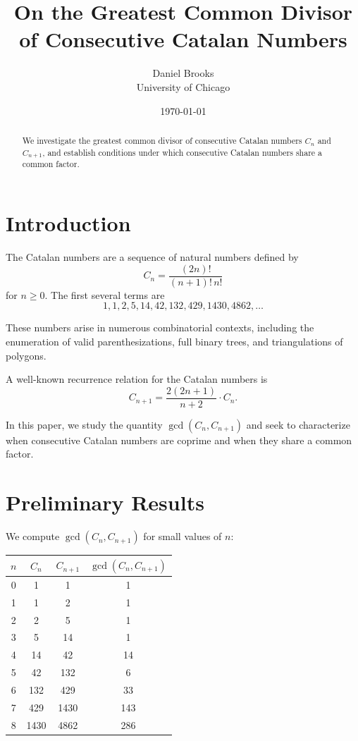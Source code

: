 \documentclass[12pt]{article}
\title{On the Greatest Common Divisor of Consecutive Catalan Numbers}
\author{Daniel Brooks \\ \small University of Chicago}
\date{\today}
\theoremstyle{definition}
\theoremstyle{remark}
\begin{document}
\maketitle

\begin{abstract}
We investigate the greatest common divisor of consecutive Catalan numbers $C_n$ and $C_{n+1}$, and establish conditions under which consecutive Catalan numbers share a common factor.
\end{abstract}

\section{Introduction}

The Catalan numbers are a sequence of natural numbers defined by
\[
C_n = \frac{(2n)!}{(n+1)!\, n!}
\]
for $n \geq 0$. The first several terms are
\[
1, 1, 2, 5, 14, 42, 132, 429, 1430, 4862, \ldots
\]

These numbers arise in numerous combinatorial contexts, including the enumeration of valid parenthesizations, full binary trees, and triangulations of polygons.

A well-known recurrence relation for the Catalan numbers is
\begin{equation}\label{eq:recurrence}
C_{n+1} = \frac{2(2n+1)}{n+2} \cdot C_n.
\end{equation}

In this paper, we study the quantity $\gcd(C_n, C_{n+1})$ and seek to characterize when consecutive Catalan numbers are coprime and when they share a common factor.

\newpage
\section{Preliminary Results}

We compute $\gcd(C_n, C_{n+1})$ for small values of $n$:
\begin{center}
\begin{tabular}{c|c|c|c}
$n$ & $C_n$ & $C_{n+1}$ & $\gcd(C_n, C_{n+1})$ \\
\hline
0 & 1 & 1 & 1 \\
1 & 1 & 2 & 1 \\
2 & 2 & 5 & 1 \\
3 & 5 & 14 & 1 \\
4 & 14 & 42 & 14 \\
5 & 42 & 132 & 6 \\
6 & 132 & 429 & 33 \\
7 & 429 & 1430 & 143 \\
8 & 1430 & 4862 & 286 \\
\end{tabular}
\end{center}
\end{document}
